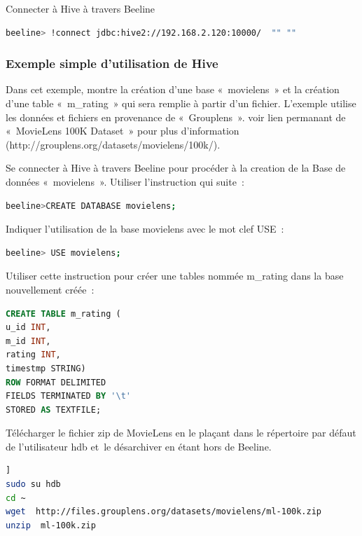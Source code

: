 \documentclass[12pt,french]{book}
\begin{document}
Connecter à Hive à travers Beeline

\begin{lstlisting}[language=bash, frame=single]
beeline> !connect jdbc:hive2://192.168.2.120:10000/  "" ""
\end{lstlisting}

\subsubsection{Exemple simple d’utilisation de Hive}

Dans cet exemple, montre la création d’une base « movielens » et la création d’une table « m\_rating » qui sera remplie à partir d’un fichier.
L’exemple utilise les données et fichiers en provenance de « Grouplens ».
voir lien permanant de « MovieLens 100K Dataset » pour plus d’information (http://grouplens.org/datasets/movielens/100k/). 

Se connecter à Hive à travers Beeline pour procéder à la creation de la Base de données « movielens ». Utiliser l’instruction qui suite :

\begin{lstlisting}[language=bash, frame=single]
beeline>CREATE DATABASE movielens;
\end{lstlisting}

Indiquer l’utilisation de la base movielens avec le mot clef USE :

\begin{lstlisting}[language=bash, frame=single]
beeline> USE movielens;
\end{lstlisting}

Utiliser cette instruction pour créer une tables nommée m\_rating dans la base nouvellement créée :

\begin{lstlisting}[language=SQL, frame=single]
CREATE TABLE m_rating (
u_id INT,
m_id INT,
rating INT,
timestmp STRING)
ROW FORMAT DELIMITED 
FIELDS TERMINATED BY '\t'
STORED AS TEXTFILE;
\end{lstlisting}

Télécharger le fichier zip de MovieLens en le plaçant dans le répertoire par défaut de l’utilisateur hdb et le désarchiver en étant hors de Beeline.  

\begin{lstlisting}[language=bash, frame=single, breaklines=true, postbreak=\mbox{\textcolor{red}{$\hookrightarrow$}\space}]]
sudo su hdb
cd ~
wget  http://files.grouplens.org/datasets/movielens/ml-100k.zip
unzip  ml-100k.zip
\end{lstlisting}
\end{document}
